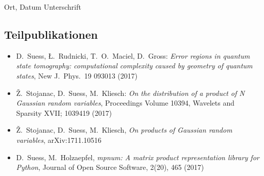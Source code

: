 \documentclass[a4paper,11pt,BCOR=8mm,twoside,headsepline]{scrbook}
\begin{document}
\vspace{4cm}

\hspace{2cm} Ort, Datum \hfill Unterschrift \hspace{2cm}

\vspace{\fill}
\subsection*{Teilpublikationen}
\begin{itemize}
  \item D.\ Suess, Ł.\ Rudnicki, T.\ O.\ Maciel, D.\ Gross: \textit{Error regions in quantum state tomography: computational complexity caused by geometry of quantum states}, New J.\ Phys.\ 19 093013 (2017)
  \item Ž.\ Stojanac, D.\ Suess, M.\ Kliesch: \textit{On the distribution of a product of N Gaussian random variables}, Proceedings Volume 10394, Wavelets and Sparsity XVII; 1039419 (2017)
  \item Ž.\ Stojanac, D.\ Suess, M.\ Kliesch, \textit{On products of Gaussian random variables}, arXiv:1711.10516
  \item D.\ Suess, M.\ Holzaepfel, \textit{mpnum: A matrix product representation library for Python}, Journal of Open Source Software, 2(20), 465 (2017)
\end{itemize}
\end{document}
